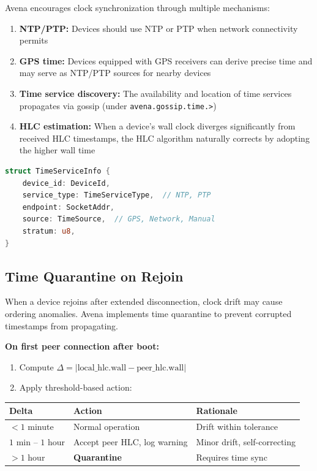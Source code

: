 Avena encourages clock synchronization through multiple mechanisms:
\begin{enumerate}
    \item \textbf{NTP/PTP:} Devices should use NTP or PTP when network connectivity permits
    \item \textbf{GPS time:} Devices equipped with GPS receivers can derive precise time and may serve as NTP/PTP sources for nearby devices
    \item \textbf{Time service discovery:} The availability and location of time services propagates via gossip (under \texttt{avena.gossip.time.>})
    \item \textbf{HLC estimation:} When a device's wall clock diverges significantly from received HLC timestamps, the HLC algorithm naturally corrects by adopting the higher wall time
\end{enumerate}

\begin{lstlisting}[language=Rust]
struct TimeServiceInfo {
    device_id: DeviceId,
    service_type: TimeServiceType,  // NTP, PTP
    endpoint: SocketAddr,
    source: TimeSource,  // GPS, Network, Manual
    stratum: u8,
}
\end{lstlisting}

\subsection{Time Quarantine on Rejoin}

When a device rejoins after extended disconnection, clock drift may cause ordering anomalies. Avena implements time quarantine to prevent corrupted timestamps from propagating.

\textbf{On first peer connection after boot:}
\begin{enumerate}
    \item Compute $\Delta = |\text{local\_hlc.wall} - \text{peer\_hlc.wall}|$
    \item Apply threshold-based action:
\end{enumerate}

\begin{tabular}{@{}lll@{}}
\toprule
\textbf{Delta} & \textbf{Action} & \textbf{Rationale} \\
\midrule
$< 1$ minute & Normal operation & Drift within tolerance \\
$1$ min -- $1$ hour & Accept peer HLC, log warning & Minor drift, self-correcting \\
$> 1$ hour & \textbf{Quarantine} & Requires time sync \\
\bottomrule
\end{tabular}

